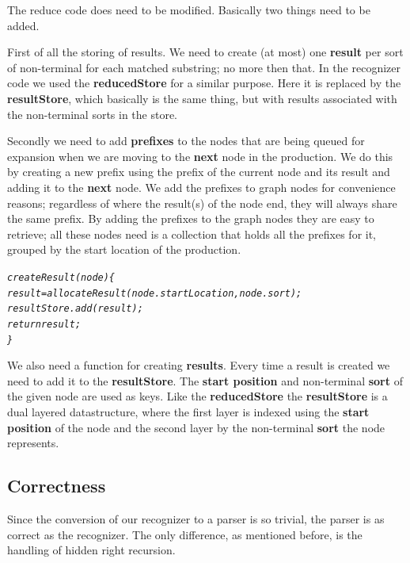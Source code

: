 \documentclass[a4paper,10pt]{article}
\begin{document}
The reduce code does need to be modified. Basically two things need to be added.

First of all the storing of results. We need to create (at most) one {\bf result} per sort of non-terminal for each matched substring; no more then that. In the recognizer code we used the {\bf reducedStore} for a similar purpose. Here it is replaced by the {\bf resultStore}, which basically is the same thing, but with results associated with the non-terminal sorts in the store.

Secondly we need to add {\bf prefixes} to the nodes that are being queued for expansion when we are moving to the {\bf next} node in the production. We do this by creating a new prefix using the prefix of the current node and its result and adding it to the {\bf next} node. We add the prefixes to graph nodes for convenience reasons; regardless of where the result(s) of the node end, they will always share the same prefix. By adding the prefixes to the graph nodes they are easy to retrieve; all these nodes need is a collection that holds all the prefixes for it, grouped by the start location of the production.

\pagebreak
{\small
\begin{alltt}
\textit{createResult(node)\{
  result = allocateResult(node.startLocation, node.sort);
  resultStore.add(result);
  return result;
\}}
\end{alltt}
}

We also need a function for creating {\bf results}. Every time a result is created we need to add it to the {\bf resultStore}. The {\bf start position} and non-terminal {\bf sort} of the given node are used as keys. Like the {\bf reducedStore} the {\bf resultStore} is a dual layered datastructure, where the first layer is indexed using the {\bf start position} of the node and the second layer by the non-terminal {\bf sort} the node represents.

\subsection{Correctness}
\label{sec:parserCorrectness}

Since the conversion of our recognizer to a parser is so trivial, the parser is as correct as the recognizer. The only difference, as mentioned before, is the handling of hidden right recursion.
\end{document}
